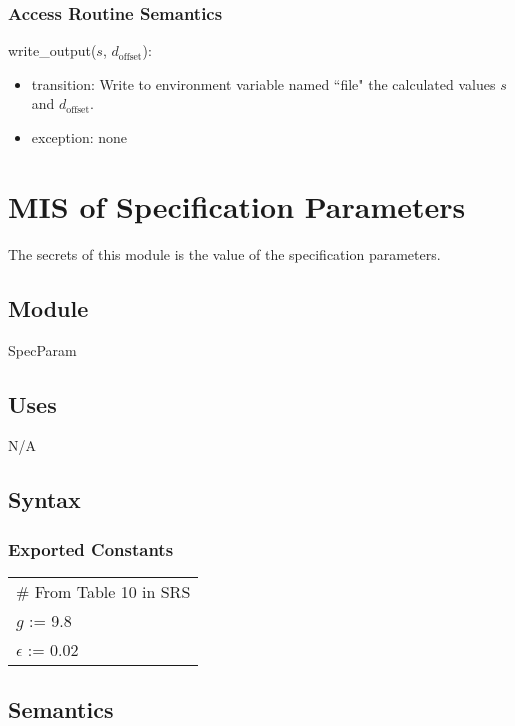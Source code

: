 \documentclass[12pt, titlepage]{article}
\begin{document}
\subsubsection{Access Routine Semantics}

\noindent write\_output($s$, $d_{\text{offset}}$):
\begin{itemize}
\item transition:  Write to environment variable named ``file" the calculated values $s$ and $d_{\text{offset}}$.
\item exception: none
\end{itemize}

\newpage

\section{MIS of Specification Parameters} \label{SpecParam}

The secrets of this module is the value of the specification parameters.

\subsection{Module}

SpecParam

\subsection{Uses}

N/A

\subsection{Syntax}

\subsubsection{Exported Constants}

\renewcommand{\arraystretch}{1.2}
\begin{longtable*}[l]{l} 
\# From Table 10 in SRS\\
  $g$ := 9.8\\
  $\epsilon$ := 0.02\\
\end{longtable*}

\subsection{Semantics}
\end{document}
